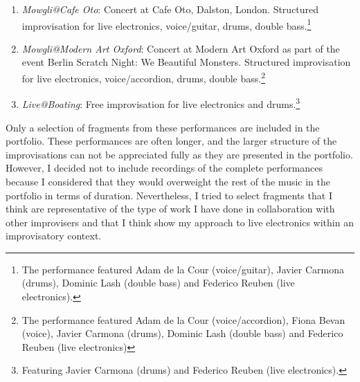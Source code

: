\begin{enumerate}
\item \emph{Mowgli@Cafe Oto}: Concert at Cafe Oto, Dalston, London. Structured improvisation for live electronics, voice/guitar, drums, double bass.\footnote{The performance featured Adam de la Cour (voice/guitar), Javier Carmona (drums), Dominic Lash (double bass) and Federico Reuben (live electronics).}
\item \emph{Mowgli@Modern Art Oxford}: Concert at Modern Art Oxford as part of the event Berlin Scratch Night: We Beautiful Monsters. Structured improvisation for live electronics, voice/accordion, drums, double bass.\footnote{The performance featured Adam de la Cour (voice/accordion), Fiona Bevan (voice), Javier Carmona (drums), Dominic Lash (double bass) and Federico Reuben (live electronics)}
\item \emph{Live@Boating}: Free improvisation for live electronics and drums.\footnote{Featuring Javier Carmona (drums) and Federico Reuben (live electronics).}
\end{enumerate}
Only a selection of fragments from these performances are included in the portfolio. These performances are often longer, and the larger structure of the improvisations can not be appreciated fully as they are presented in the portfolio. However, I decided not to include recordings of the complete performances because I considered that they would overweight the rest of the music in the portfolio in terms of duration. Nevertheless, I tried to select fragments that I think are representative of the type of work I have done in collaboration with other improvisers and that I think show my approach to live electronics within an improvisatory context.

\label{ch:compositions}